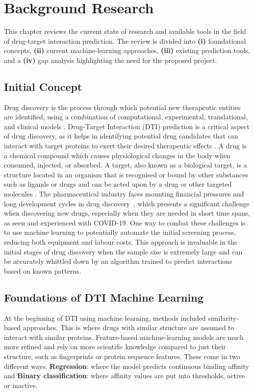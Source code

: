 \chapter{Background Research}
\sloppy
This chapter reviews the current state of research and available tools in the field of drug-target interaction prediction.
The review is divided into \textbf{(i)} foundational concepts, \textbf{(ii)} current machine-learning approaches, \textbf{(iii)} existing prediction tools, and a \textbf{(iv)} gap analysis highlighting the need for the proposed project.
\section{Initial Concept}
Drug discovery is the process through which potential new therapeutic entities are identified, using a combination of computational, experimental, translational, and clinical models \citep{Zhou2017}.
Drug-Target Interaction (DTI) prediction is a critical aspect of drug discovery, as it helps in identifying potential drug candidates that can interact with target proteins to exert their desired therapeutic effects \citep{Yang2024}.
A drug is a chemical compound which causes physiological changes in the body when consumed, injected, or absorbed.
A target, also known as a biological target, is a structure located in an organism that is recognised or bound by other substances such as ligands or drugs and can be acted upon by a drug or other targeted molecules \citep{Overington2006}.
The pharmaceutical industry faces mounting financial pressures and long development cycles in drug discovery~\citep{wouters2020estimated}, which presents a significant challenge when discovering new drugs, especially when they are needed in short time spans, as seen and experienced with COVID-19.
One way to combat these challenges is to use machine learning to potentially automate the initial screening process, reducing both equipment and labour costs.
This approach is invaluable in the initial stages of drug discovery when the sample size is extremely large and can be accurately whittled down by an algorithm trained to predict interactions based on known patterns.


\section{Foundations of DTI Machine Learning}
At the beginning of DTI using machine learning, methods included similarity-based approaches.
This is where drugs with similar structure are assumed to interact with similar proteins.
Feature-based machine-learning models are much more refined and rely on more scientific knowledge compared to just their structure, such as fingerprints or protein sequence features.
These come in two different ways, \textbf{Regression}: where the model predicts continuous binding affinity and \textbf{Binary classification}: where affinity values are put into thresholds, active or inactive.

